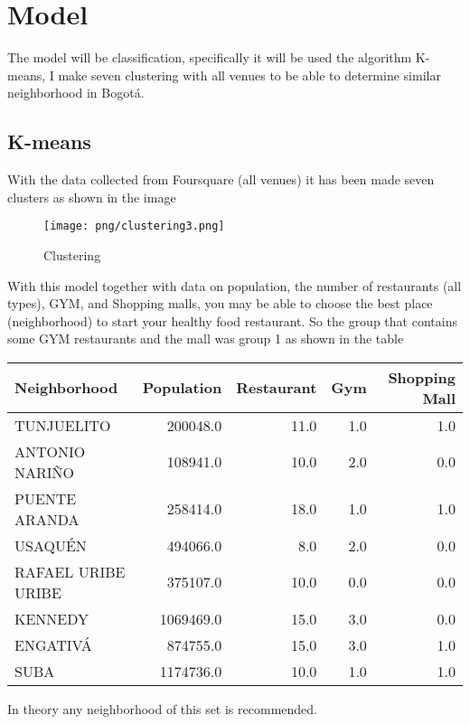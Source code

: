 {\justifying
	\chapter{Model}
	The model will be classification, specifically it will be used the algorithm K-means, I make seven clustering with all venues to be able to determine similar neighborhood in Bogotá.
	\section{K-means}
	With the data collected from Foursquare (all venues) it has been made seven clusters as shown in the image
	\begin{figure}[H]
		\centering
		\texttt{[image: png/clustering3.png]}
		\caption{Clustering}
	\end{figure}
	With this model together with data on population, the number of restaurants (all types), GYM, and Shopping malls, you may be able to choose the best place (neighborhood) to start your healthy food restaurant. So the group that contains some GYM restaurants and the mall was group 1 as shown in the table
	\begin{center}
		\begin{tabular}{lrrrr}
			\toprule
			Neighborhood &  Population &  Restaurant &  Gym &  Shopping Mall \\
			\midrule
			TUNJUELITO &         200048.0 &        11.0 &  1.0 &            1.0 \\
			ANTONIO NARIÑO &	108941.0 &	10.0 &	2.0 &	0.0\\
			PUENTE ARANDA &         258414.0 &        18.0 &  1.0 &            1.0 \\
			USAQUÉN &         494066.0 &         8.0 &  2.0 &            0.0 \\
			RAFAEL URIBE URIBE &         375107.0 &        10.0 &  0.0 &            0.0 \\
			KENNEDY &        1069469.0 &        15.0 &  3.0 &            0.0 \\
			ENGATIVÁ &         874755.0 &        15.0 &  3.0 &            1.0 \\
			SUBA &        1174736.0 &        10.0 &  1.0 &            1.0 \\
			\bottomrule
		\end{tabular}
	\end{center}
	In theory any neighborhood of this set is recommended.
}

